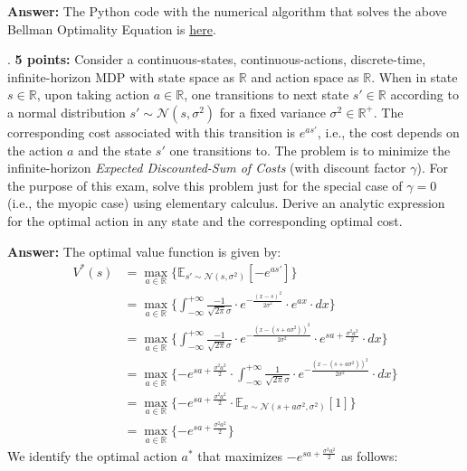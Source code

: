\documentclass[12pt]{exam}
\begin{document}
\begin{questions}
\begin{itemize}
{\bf Answer:} The Python code with the numerical algorithm that solves the above Bellman Optimality Equation is \href{https://github.com/coverdrive/MDP-DP-RL/blob/master/src/examples/wage_max.py}{here}.

\end{itemize}

. {\bf 5 points:} Consider a continuous-states, continuous-actions, discrete-time, infinite-horizon MDP with state space as $\mathbb{R}$ and action space as $\mathbb{R}$. When in state $s\in \mathbb{R}$, upon taking action $a\in \mathbb{R}$, one transitions to next state $s' \in \mathbb{R}$ according to a normal distribution $s' \sim \mathcal{N}(s, \sigma^2)$ for a fixed variance $\sigma^2 \in \mathbb{R}^+$. The corresponding cost associated with this transition is $e^{as'}$, i.e., the cost depends on the action $a$ and the state $s'$ one transitions to. The problem is to minimize the  infinite-horizon {\em Expected Discounted-Sum of Costs} (with discount factor $\gamma$). For the purpose of this exam, solve this problem just for the special case of $\gamma = 0$ (i.e., the myopic case) using elementary calculus. Derive an analytic expression for the optimal action in any state and the corresponding optimal cost.

{\bf Answer: } The optimal value function is given by:
\begin{align*}
V^*(s) & = \max_{a \in \mathbb{R}} \{ \mathbb{E}_{s' \sim \mathcal{N}(s,\sigma^2)}[-e^{as'}] \}\\
& = \max_{a \in \mathbb{R}} \{ \int_{-\infty}^{+\infty} \frac {-1} {\sqrt{2\pi} \sigma} \cdot e^{-\frac {(x - s)^2} {2\sigma^2}} \cdot e^{ax} \cdot dx \} \\
& = \max_{a \in \mathbb{R}}  \{ \int_{-\infty}^{+\infty} \frac {-1} {\sqrt{2\pi} \sigma} \cdot e^{-\frac {(x-(s +a\sigma^2))^2} {2\sigma^2}} \cdot e^{s a + \frac {\sigma^2 a^2} {2}} \cdot dx \}\\
& = \max_{a \in \mathbb{R}} \{-e^{s a + \frac {\sigma^2 a^2} 2} \cdot \int_{-\infty}^{+\infty} \frac {1} {\sqrt{2\pi} \sigma} \cdot e^{-\frac {(x-(s +a\sigma^2))^2} {2\sigma^2}} \cdot dx \} \\
& = \max_{a \in \mathbb{R}} \{-e^{s a + \frac {\sigma^2 a^2} 2} \cdot \mathbb{E}_{x\sim \mathcal{N}(s + a\sigma^2, \sigma^2)}[1] \} \\
& = \max_{a \in \mathbb{R}} \{ -e^{s a + \frac {\sigma^2 a^2} 2} \}
\end{align*}
We identify the optimal action $a^*$ that maximizes $-e^{s a + \frac {\sigma^2 a^2} 2}$ as follows:


\end{questions}
\end{document}
